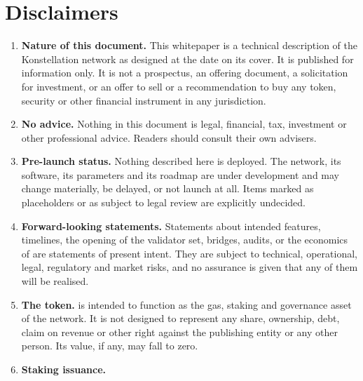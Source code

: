 \section{Disclaimers}
\label{sec:disclaimers}


\begin{enumerate}[leftmargin=*]
\item \textbf{Nature of this document.} This whitepaper is a technical
  description of the Konstellation network as designed at the date on its
  cover. It is published for information only. It is not a prospectus, an
  offering document, a solicitation for investment, or an offer to sell or a
  recommendation to buy any token, security or other financial instrument in
  any jurisdiction.
\item \textbf{No advice.} Nothing in this document is legal, financial, tax,
  investment or other professional advice. Readers should consult their own
  advisers.
\item \textbf{Pre-launch status.} Nothing described here is deployed. The
  network, its software, its parameters and its roadmap are under development
  and may change materially, be delayed, or not launch at all. Items marked as
  placeholders or as subject to legal review are explicitly undecided.
\item \textbf{Forward-looking statements.} Statements about intended features,
  timelines, the opening of the validator set, bridges, audits, or the
  economics of \kash{} are statements of present intent. They are subject
  to technical, operational, legal, regulatory and market risks, and no
  assurance is given that any of them will be realised.
\item \textbf{The \kash{} token.} \kash{} is intended to function as the gas,
  staking and governance asset of the network. It is not designed to represent
  any share, ownership, debt, claim on revenue or other right against the
  publishing entity or any other person.  Its value, if
  any, may fall to zero.
\item \textbf{Staking issuance.} 
\end{enumerate}
